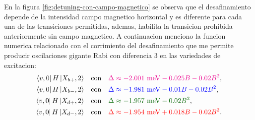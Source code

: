 \documentclass[main.tex]{subfiles}
\begin{document}
En la figura \ref{fig:detuning-con-campo-magnetico} se observa que el desafinamiento depende de la intensidad campo magnetico horizontal y es diferente para cada una de las transiciones permitidas, ademas, habilita la transicion prohibida anteriormente sin campo magnetico. A continuacion menciono la funcion numerica relacionado con el corrimiento del desafinamiento que me permite producir oscilaciones gigante Rabi con diferencia 3 en las variedades de excitacion:
\begin{align}
	\bra{v,0}H\ket{X_{b+},2} &\quad \text{con} \quad \textcolor{magenta}{\Delta \approx -2.001\text{ meV} - 0.025B - 0.02B^2},\\
	\bra{v,0}H\ket{X_{b-},2} &\quad \text{con} \quad \textcolor{blue}{\Delta \approx -1.981\text{ meV} - 0.01B - 0.02B^2},\\
	\bra{v,0}H\ket{X_{d+},2} &\quad \text{con} \quad \textcolor{darkgreen}{\Delta \approx -1.957\text{ meV} - 0.02B^2},\\
	\bra{v,0}H\ket{X_{d-},2} &\quad \text{con} \quad \textcolor{red}{\Delta \approx -1.954\text{ meV} + 0.018B - 0.02B^2}.
\end{align}


%
\end{document}
